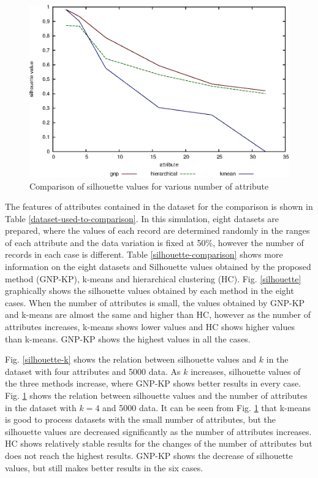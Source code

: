 \documentclass{elsart}
\begin{document}
\begin{figure}
\begin{center}
\includegraphics[width=12cm]{images/silhouette-attribute}
\caption{\label{silhouette-attribute} Comparison of silhouette values for various number of attribute}
\end{center}
\end{figure}

The features of attributes contained in the dataset for the comparison is shown in Table \ref{dataset-used-to-comparison}. 
In this simulation, eight datasets are prepared, where the values of each record are determined randomly in the ranges of each attribute and the data variation is fixed at 50\%, however the number of records in each case is different.
Table \ref{silhouette-comparison} shows more information on the eight datasets and Silhouette values obtained by the proposed method (GNP-KP), k-means and hierarchical clustering (HC). 
Fig. \ref{silhouette} graphically shows the silhouette values obtained by each method in the eight cases. When the number of attributes is small, the values obtained by GNP-KP and k-means are almost the same and higher than HC, however as the number of attributes increases, k-means shows lower values and HC shows higher values than k-means. GNP-KP shows the highest values in all the cases.

Fig. \ref{silhouette-k} shows the relation between silhouette values and $k$ in the dataset with four attributes and 5000 data. As $k$ increases, silhouette values of the three methods increase, where GNP-KP shows better results in every case. Fig. \ref{silhouette-attribute} shows the relation between silhouette values and the number of attributes in the dataset with $k=4$ and 5000 data. It can be seen from Fig. \ref{silhouette-attribute} that k-means is good to process datasets with the small number of attributes, but the silhouette values are decreased significantly as the number of attributes increases. HC shows relatively stable results for the changes of the number of attributes but does not reach the highest results. GNP-KP shows the decrease of silhouette values, but still makes better results in the six cases.
\end{document}
